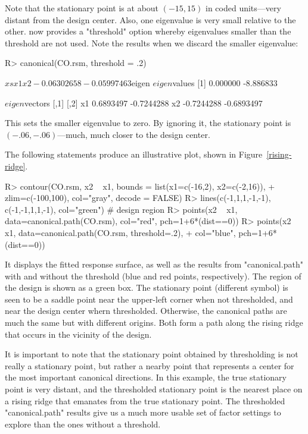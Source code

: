 \documentclass[article,nojss]{jss}
\def\rsm{\pkg{rsm}}
\begin{document}
%
Note that the stationary point is at about $(-15,15)$ in coded units---very distant from the design center. Also, one eigenvalue is very small relative to the other. \rsm{} now provides a "threshold" option whereby eigenvalues smaller than the threshold are not used. Note the results when we discard the smaller eigenvalue:
\begin{Schunk}
\begin{Sinput}
R> canonical(CO.rsm, threshold = .2)
\end{Sinput}
\begin{Soutput}
$xs
         x1          x2 
-0.06302658 -0.05997463 

$eigen
$eigen$values
[1]  0.000000 -8.886833

$eigen$vectors
         [,1]       [,2]
x1  0.6893497 -0.7244288
x2 -0.7244288 -0.6893497
\end{Soutput}
\end{Schunk}
This sets the smaller eigenvalue to zero. By ignoring it, the stationary point is $(-.06,-.06)$---much, much closer to the design center. 

The following statements produce an illustrative plot, shown in Figure~\ref{rising-ridge}.
\begin{Schunk}
\begin{Sinput}
R> contour(CO.rsm, x2 ~ x1, bounds = list(x1=c(-16,2), x2=c(-2,16)), 
+         zlim=c(-100,100), col="gray", decode = FALSE)
R> lines(c(-1,1,1,-1,-1), c(-1,-1,1,1,-1), col="green") # design region
R> points(x2 ~ x1, data=canonical.path(CO.rsm), col="red", pch=1+6*(dist==0))
R> points(x2 ~ x1, data=canonical.path(CO.rsm, threshold=.2), 
+         col="blue", pch=1+6*(dist==0))
\end{Sinput}
\end{Schunk}
It displays the fitted response surface, as well as the results from "canonical.path" with and without the threshold (blue and red points, respectively). The region of the design is shown as a green box. The stationary point (different symbol) is seen to be a saddle point near the upper-left corner when not thresholded, and near the design center whern thresholded. Otherwise, the canonical paths are much the same but with different origins. Both form a path along the rising ridge that occurs in the vicinity of the design. 

It is important to note that the stationary point obtained by thresholding is not really a stationary point, but rather a nearby point that represents a center for the most important canonical directions. In this example, the true stationary point is very distant, and the thresholded stationary point is the nearest place on a rising ridge that emanates from the true stationary point. The thresholded "canonical.path" results give us a much more usable set of factor settings to explore than the ones without a threshold.
\end{document}
